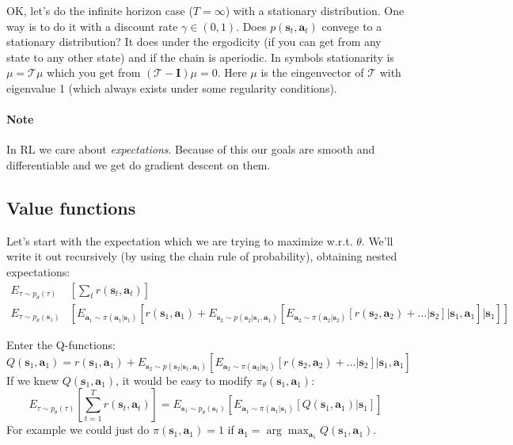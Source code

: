 \documentclass{report}
\newcommand{\argmax}{\arg\!\max}
\begin{document}
OK, let's do the infinite horizon case ($T = \infty $) with a stationary distribution.
One way is to do it with a discount rate $\gamma \in (0,1)$.
Does $p(\bm{s}_t, \bm{a}_t)$ convege to a stationary distribution?
It does under the ergodicity (if you can get from any state to any other state) and if the chain is aperiodic.
In symbols stationarity is $\mu = \mathcal{T}\mu$ which you get from $(\mathcal{T} - \bm{I})\mu = 0$.
Here $\mu$ is the eingenvector of $\mathcal{T}$ with eigenvalue 1 (which always exists under some regularity conditions).
\paragraph{Note} In RL we care about \textit{expectations}.
Because of this our goals are smooth and differentiable and we get do gradient descent on them.

\subsection{Value functions}
Let's start with the expectation which we are trying to maximize w.r.t. $\theta$.
We'll write it out recursively (by using the chain rule of probability), obtaining nested expectations:
\begin{align}
		E_{\tau \sim p_\theta(\tau)} & \left[ \sum_{t}^{} r(\bm{s}_t, \bm{a}_t) \right] \\
		E_{\tau \sim p_\theta(\bm{s}_1)} & \left[ E_{\bm{a}_1 \sim \pi(\bm{a}_1|\bm{s}_1)}
		\left[ r(\bm{s}_1, \bm{a}_1) + E_{\bm{s}_2  \sim p(\bm{s}_2 | \bm{s}_1, \bm{a}_1)} 
\left [				E_{\bm{a}_2 \sim \pi(\bm{a}_2|\bm{s}_2)}
				\left[ r(\bm{s}_2, \bm{a}_2) + \dots | \bm{s}_2 \right] | \bm{s}_1, \bm{a}_1
\right] | \bm{s}_1  \right] \right ]
\end{align}

Enter the Q-functions:
\begin{equation}
		Q(\bm{s}_1, \bm{a}_1) = 
r(\bm{s}_1, \bm{a}_1) + E_{\bm{s}_2  \sim p(\bm{s}_2 | \bm{s}_1, \bm{a}_1)} 
\left [				E_{\bm{a}_2 \sim \pi(\bm{a}_2|\bm{s}_2)}
				\left[ r(\bm{s}_2, \bm{a}_2) + \dots | \bm{s}_2 \right] | \bm{s}_1, \bm{a}_1
\right]
\end{equation}
If we knew $Q(\bm{s}_1, \bm{a}_1)$, it would be easy to modify $\pi_\theta (\bm{s}_1, \bm{a}_1)$:
\begin{equation}
	E_{\tau \sim p_\theta(\tau)} \left[  \sum_{t=1}^{T} r(\bm{s}_t, \bm{a}_t) \right] 	
	= E_{\bm{s}_1 \sim p_\theta(\bm{s}_1)}
	\left[  E_{\bm{a}_1 \sim \pi(\bm{a}_1|\bm{s}_1)} \left[ Q(\bm{s}_1, \bm{a}_1) |\bm{s}_1 \right]   \right] 
\end{equation}
For example we could just do $\pi(\bm{s}_1, \bm{a}_1) = 1$ 
if $\bm{a}_1 = \argmax_{\bm{a}_1} Q(\bm{s}_1, \bm{a}_1)$.
\end{document}
